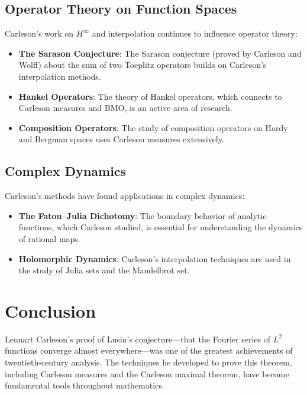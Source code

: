 \subsection{Operator Theory on Function Spaces}

Carleson's work on $H^\infty$ and interpolation continues to influence operator theory:

\begin{itemize}
\item \textbf{The Sarason Conjecture}: The Sarason conjecture (proved by Carleson and Wolff) about the sum of two Toeplitz operators builds on Carleson's interpolation methods.

\item \textbf{Hankel Operators}: The theory of Hankel operators, which connects to Carleson measures and BMO, is an active area of research.

\item \textbf{Composition Operators}: The study of composition operators on Hardy and Bergman spaces uses Carleson measures extensively.
\end{itemize}

\subsection{Complex Dynamics}

Carleson's methods have found applications in complex dynamics:

\begin{itemize}
\item \textbf{The Fatou--Julia Dichotomy}: The boundary behavior of analytic functions, which Carleson studied, is essential for understanding the dynamics of rational maps.

\item \textbf{Holomorphic Dynamics}: Carleson's interpolation techniques are used in the study of Julia sets and the Mandelbrot set.
\end{itemize}

\section{Conclusion}

Lennart Carleson's proof of Lusin's conjecture---that the Fourier series of $L^2$ functions converge almost everywhere---was one of the greatest achievements of twentieth-century analysis. The techniques he developed to prove this theorem, including Carleson measures and the Carleson maximal theorem, have become fundamental tools throughout mathematics.

